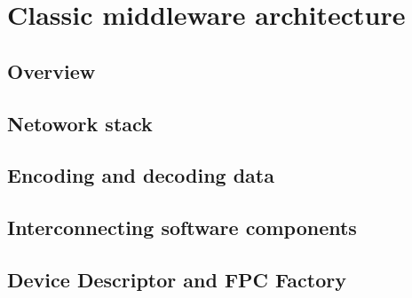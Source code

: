 \chapter{Classic middleware architecture}

\section{Overview}

\section{Netowork stack}

\section{Encoding and decoding data}

\section{Interconnecting software components}

\section{Device Descriptor and FPC Factory}
